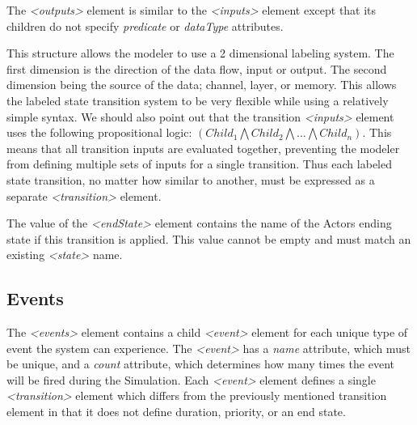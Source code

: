 The {\em \textless outputs\textgreater} element is similar to the {\em \textless inputs\textgreater} element except that its children do not specify {\em predicate} or {\em dataType} attributes.  

This structure allows the modeler to use a 2 dimensional labeling system.  The first dimension is the direction of the data flow, input or output.  The second dimension being the source of the data; channel, layer, or memory.  This allows the labeled state transition system to be very flexible while using a relatively simple syntax.  We should also point out that the transition {\em \textless inputs\textgreater} element uses the following propositional logic: $(Child_{1} \bigwedge Child_{2} \bigwedge \ldots \bigwedge Child_{n})$.  This means that all transition inputs are evaluated together, preventing the modeler from defining multiple sets of inputs for a single transition.  Thus each labeled state transition, no matter how similar to another, must be expressed as a separate {\em \textless transition\textgreater} element.

The value of the {\em \textless endState\textgreater} element contains the name of the Actors ending state if this transition is applied.  This value cannot be empty and must match an existing {\em \textless state\textgreater} name.

\begin{spacing}{.5}

\end{spacing}


\subsection{Events}

The {\em \textless events\textgreater} element contains a child {\em \textless event\textgreater} element for each unique type of event the system can experience.  The {\em \textless event\textgreater} has a {\em name} attribute, which must be unique, and a {\em count} attribute, which determines how many times the event will be fired during the Simulation.  Each {\em \textless event\textgreater} element defines a single {\em \textless transition\textgreater} element which differs from the previously mentioned transition element in that it does not define duration, priority, or an end state.

\begin{spacing}{.5}

\end{spacing}

